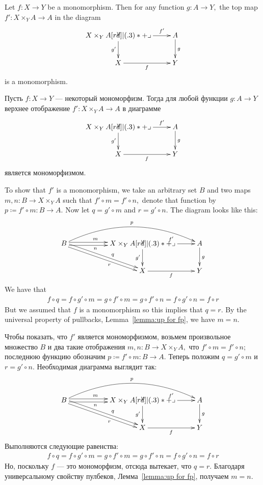 \documentclass[../main/CT4S-EN-RU]{subfiles}
\begin{document}
\begin{propositionENG}\label{prop:pb preserve mono}
Let $f\colon X{→} Y$ be a monomorphism. Then for any function $g\colon A{→} Y,$ the top map $f'\colon X\times_YA{→} A$ in the diagram
$$
\xymatrix{X\times_YA\ar[r]^-{f'}\ar[d]_{g'}\ullimit&A\ar[d]^g\\X\ar[r]_f&Y}
$$
is a monomorphism.
\end{propositionENG}

\begin{propositionRUS}\label{prop:pb preserve mono}
Пусть $f\colon X{→} Y$ — некоторый мономорфизм. Тогда для любой функции $g\colon A{→} Y$ верхнее отображение $f'\colon X\times_YA{→} A$ в диаграмме
$$
\xymatrix{X\times_YA\ar[r]^-{f'}\ar[d]_{g'}\ullimit&A\ar[d]^g\\X\ar[r]_f&Y}
$$
является мономорфизмом.
\end{propositionRUS}

\begin{proofENG}
To show that $f'$ is a monomorphism, we take an arbitrary set $B$ and two maps $m,n\colon B{→} X\times_YA$ such that $f'\circ m=f'\circ n,$ denote that function by $p{\coloneqq}f'\circ m\colon B{→} A.$ Now let $q=g'\circ m$ and $r=g'\circ n.$ The diagram looks like this:
$$
\xymatrix{B\ar@<.5ex>[rr]^(.4)m\ar@<-.5ex>[rr]_(.4)n\ar@/^2pc/[rrr]^p\ar@<.5ex>[drr]^(.6)q\ar@<-.5ex>[drr]_(.6)r&&X\times_YA\ar[r]^{f'}\ar[d]_{g'}\ullimit&A\ar[d]^g\\&&X\ar[r]_f&Y}
$$
We have that 
\begin{align*}f\circ q=f\circ g'\circ m=g\circ f'\circ m=g\circ f'\circ n=f\circ g'\circ n=f\circ r\end{align*} 
But we assumed that $f$ is a monomorphism so this implies that $q=r.$ By the universal property of pullbacks, Lemma~\ref{lemma:up for fp}, we have $m=n.$
\end{proofENG}

\begin{proofRUS}
Чтобы показать, что $f'$ является мономорфизмом, возьмем произвольное множество $B$ и два такие отображения $m,n\colon B{→} X\times_YA,$ что $f'\circ m=f'\circ n$; последнюю функцию обозначим $p{\coloneqq}f'\circ m\colon B{→} A.$ Теперь положим $q=g'\circ m$ и $r=g'\circ n.$ Необходимая диаграмма выглядит так:
$$
\xymatrix{B\ar@<.5ex>[rr]^(.4)m\ar@<-.5ex>[rr]_(.4)n\ar@/^2pc/[rrr]^p\ar@<.5ex>[drr]^(.6)q\ar@<-.5ex>[drr]_(.6)r&&X\times_YA\ar[r]^{f'}\ar[d]_{g'}\ullimit&A\ar[d]^g\\&&X\ar[r]_f&Y}
$$
Выполняются следующие равенства:
\begin{align*}f\circ q=f\circ g'\circ m=g\circ f'\circ m=g\circ f'\circ n=f\circ g'\circ n=f\circ r\end{align*} 
Но, поскольку $f$ — это мономорфизм, отсюда вытекает, что $q=r.$ Благодаря универсальному свойству пулбеков, Лемма~\ref{lemma:up for fp}, получаем $m=n.$
\end{proofRUS}
\end{document}

